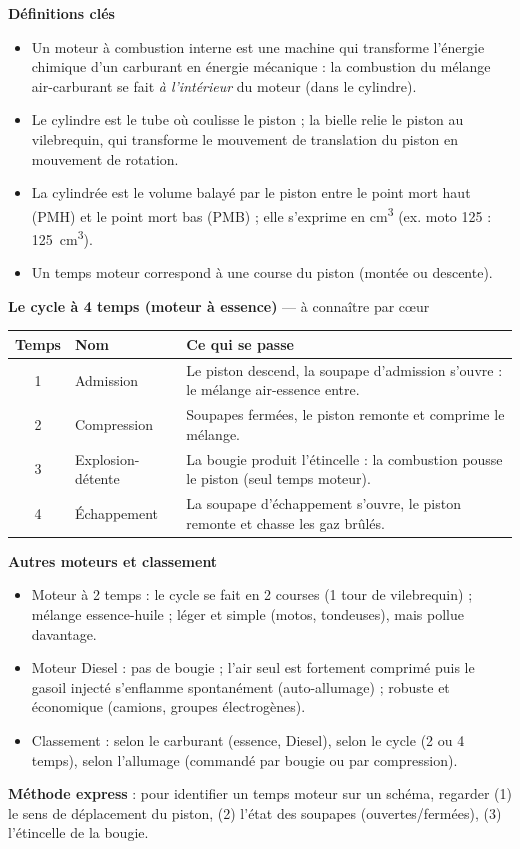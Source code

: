\documentclass[11pt]{article}
\newcommand{\cle}[1]{{\popxbold\color{popdark}#1}}
\begin{document}
\begin{bilan}
\textbf{Définitions clés}
\begin{itemize}
\item Un \cle{moteur à combustion interne} est une machine qui transforme l'\cle{énergie chimique} d'un carburant en \cle{énergie mécanique} : la combustion du mélange air-carburant se fait \emph{à l'intérieur} du moteur (dans le cylindre).
\item Le \cle{cylindre} est le tube où coulisse le \cle{piston} ; la \cle{bielle} relie le piston au \cle{vilebrequin}, qui transforme le mouvement de translation du piston en mouvement de rotation.
\item La \cle{cylindrée} est le volume balayé par le piston entre le point mort haut (PMH) et le point mort bas (PMB) ; elle s'exprime en \si{cm^3} (ex. moto 125 : \SI{125}{cm^3}).
\item Un \cle{temps moteur} correspond à une course du piston (montée ou descente).
\end{itemize}
\textbf{Le cycle à 4 temps (moteur à essence)} — à connaître par cœur
\begin{center}
\begin{tabularx}{\linewidth}{|c|l|X|}\hline
\rowcolor{popblueL} \textbf{Temps} & \textbf{Nom} & \textbf{Ce qui se passe} \\ \hline
1 & Admission & Le piston descend, la soupape d'admission s'ouvre : le mélange air-essence entre. \\ \hline
2 & Compression & Soupapes fermées, le piston remonte et comprime le mélange. \\ \hline
3 & Explosion-détente & La bougie produit l'étincelle : la combustion pousse le piston (seul temps moteur). \\ \hline
4 & Échappement & La soupape d'échappement s'ouvre, le piston remonte et chasse les gaz brûlés. \\ \hline
\end{tabularx}
\end{center}
\textbf{Autres moteurs et classement}
\begin{itemize}
\item \cle{Moteur à 2 temps} : le cycle se fait en 2 courses (1 tour de vilebrequin) ; mélange essence-huile ; léger et simple (motos, tondeuses), mais pollue davantage.
\item \cle{Moteur Diesel} : pas de bougie ; l'air seul est fortement comprimé puis le gasoil injecté \cle{s'enflamme spontanément} (auto-allumage) ; robuste et économique (camions, groupes électrogènes).
\item Classement : selon le \cle{carburant} (essence, Diesel), selon le \cle{cycle} (2 ou 4 temps), selon l'\cle{allumage} (commandé par bougie ou par compression).
\end{itemize}
\textbf{Méthode express} : pour identifier un temps moteur sur un schéma, regarder (1) le sens de déplacement du piston, (2) l'état des soupapes (ouvertes/fermées), (3) l'étincelle de la bougie.
\end{bilan}
\end{document}
